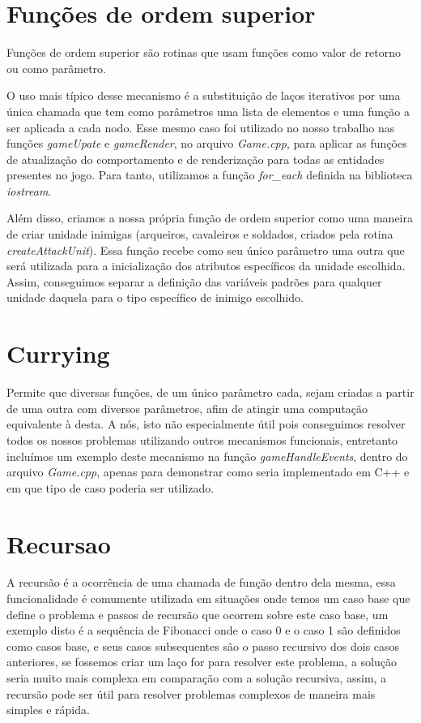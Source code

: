 \documentclass[rel_mlp]{iiufrgs}
\begin{document}
 \section{Funções de ordem superior}

	Funções de ordem superior são rotinas que usam funções como valor de retorno ou como parâmetro.

	O uso mais típico desse mecanismo é a substituição de laços iterativos por uma única chamada que tem como parâmetros uma lista de elementos e uma função a ser aplicada a cada nodo. Esse mesmo caso foi utilizado no nosso trabalho nas funções \textit{gameUpate} e \textit{gameRender}, no arquivo \textit{Game.cpp}, para aplicar as funções de atualização do comportamento e de renderização para todas as entidades presentes no jogo. Para tanto, utilizamos a função \textit{for\_each}	definida na biblioteca \textit{iostream}.

	Além disso, criamos a nossa própria função de ordem superior como uma maneira de criar unidade inimigas (arqueiros, cavaleiros e soldados, criados pela rotina \textit{createAttackUnit}). Essa função recebe como seu único parâmetro uma outra que será utilizada para a inicialização dos atributos específicos da unidade escolhida. Assim, conseguimos separar a definição das variáveis padrões para qualquer unidade daquela para o tipo específico de inimigo escolhido.

 \section{Currying}
 
	Permite que diversas funções, de um único parâmetro cada, sejam criadas a partir de uma outra com diversos parâmetros, afim de atingir uma computação equivalente à desta. A nós, isto não especialmente útil pois conseguimos resolver todos os nossos problemas utilizando outros mecanismos funcionais, entretanto incluímos um exemplo deste mecanismo na função \textit{gameHandleEvents}, dentro do arquivo \textit{Game.cpp}, apenas para demonstrar como seria implementado em C++ e em que tipo de caso poderia ser utilizado.
 \section{Recursao}
 
 A recursão é a ocorrência de uma chamada de função dentro dela mesma, essa funcionalidade é comumente utilizada em situações onde temos um caso base que define o problema e passos de recursão que ocorrem sobre este caso base, um exemplo disto é a sequência de  Fibonacci onde o caso 0 e o caso 1 são definidos como casos base, e seus casos subsequentes são o passo recursivo dos dois casos anteriores, se fossemos criar um laço for para resolver este problema, a solução seria muito mais complexa em comparação com a solução recursiva, assim, a recursão pode ser útil para resolver problemas complexos de maneira mais simples e rápida.
 
\end{document}
